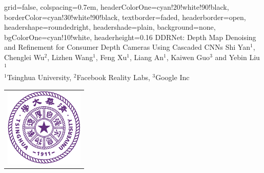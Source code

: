 \documentclass[landscape,a0paper,fontscale=0.292]{baposter}
\begin{document}
\begin{poster}{
 grid=false,
 colspacing=0.7em,
 headerColorOne=cyan!20!white!90!black,
 borderColor=cyan!30!white!90!black,
 textborder=faded,
 headerborder=open,
 headershape=roundedright,
 headershade=plain,
 background=none,
 bgColorOne=cyan!10!white,
 headerheight=0.16\textheight}
 {
 }
 {DDRNet: Depth Map Denoising and Refinement for Consumer Depth Cameras Using Cascaded CNNs}
 {Shi Yan$^1$, Chenglei Wu$^2$,	Lizhen Wang$^1$, Feng Xu$^1$, Liang An$^1$, Kaiwen Guo$^3$ and Yebin Liu$^1$\\
 {$^1$Tsinghua University, $^2$Facebook Reality Labs, $^3$Google Inc}}
 {
  \begin{tabular}{c}
    \includegraphics[height=0.12\textheight]{thu-fig-logo.pdf}\\
  \end{tabular}
 }



\end{poster}
\end{document}
